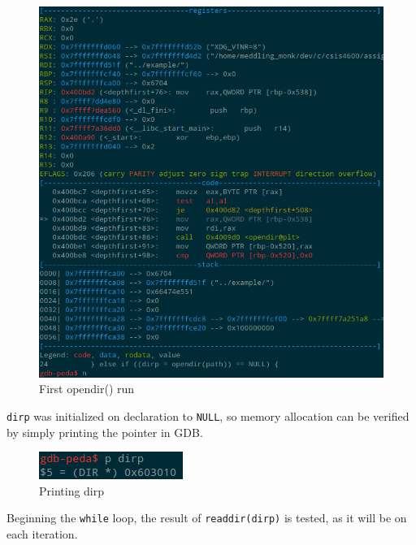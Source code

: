\documentclass[a4paper,12pt,sffamily]{article}
\begin{document}
\begin{figure}[H]
	\centering
	\includegraphics[width=1\linewidth]{./images/4}
	\caption[First_opendir]{First opendir() run}
	\label{fig:4}
\end{figure}
\texttt{dirp} was initialized on declaration to \texttt{NULL}, so memory allocation can be
verified by simply printing the pointer in GDB.
\begin{figure}[H]
	\centering
	\includegraphics[width=.3\linewidth]{./images/5}
	\caption[print_dirp_pointer]{Printing dirp}
	\label{fig:5}
\end{figure}
Beginning the \texttt{while} loop, the result of \texttt{readdir(dirp)} is tested, as it
will be on each iteration.
\end{document}
